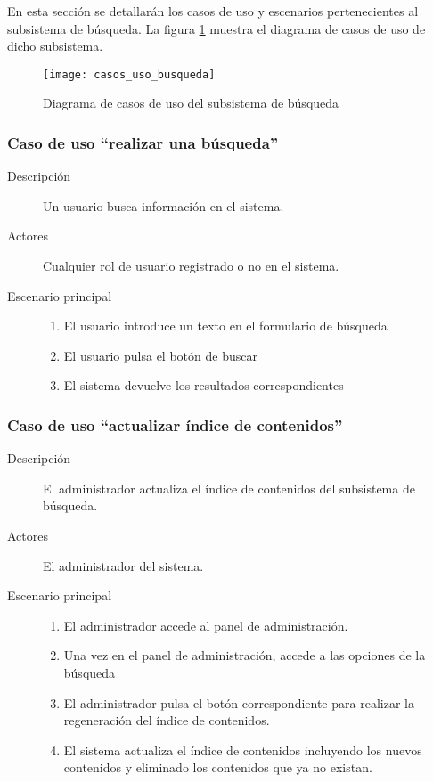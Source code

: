 En esta sección se detallarán los casos de uso y escenarios pertenecientes al subsistema de búsqueda. La figura \ref{fig:casos_uso_subsistema_busqueda} muestra el diagrama de casos de uso de dicho subsistema.

\begin{figure}[h]
\centering
\texttt{[image: casos\_uso\_busqueda]}
\caption{Diagrama de casos de uso del subsistema de búsqueda}
\label{fig:casos_uso_subsistema_busqueda}
\end{figure}

\subsubsection{Caso de uso ``realizar una búsqueda''}
\begin{description}
\item[Descripción] Un usuario busca información en el sistema.
\item[Actores] Cualquier rol de usuario registrado o no en el sistema.
\item[Escenario principal] \hfill
							\begin{enumerate}
							\item El usuario introduce un texto en el formulario de búsqueda
							\item El usuario pulsa el botón de buscar
							\item El sistema devuelve los resultados correspondientes
							\end{enumerate}						
\end{description}

\subsubsection{Caso de uso ``actualizar índice de contenidos''}
\begin{description}
\item[Descripción] El administrador actualiza el índice de contenidos del subsistema de búsqueda.
\item[Actores] El administrador del sistema.
\item[Escenario principal] \hfill
							\begin{enumerate}
							\item El administrador accede al panel de administración.
							\item Una vez en el panel de administración, accede a las opciones de la búsqueda
							\item El administrador pulsa el botón correspondiente para realizar la regeneración del índice de contenidos.
							\item El sistema actualiza el índice de contenidos incluyendo los nuevos contenidos y eliminado los contenidos que ya no existan.
							\end{enumerate}						
\end{description}